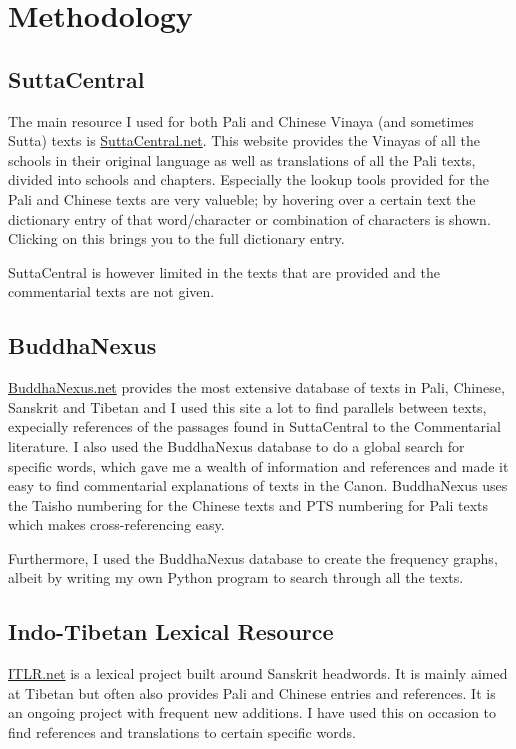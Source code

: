 \section{Methodology}

\subsection{SuttaCentral}
The main resource I used for both Pali and Chinese Vinaya (and sometimes Sutta) texts is \href{https://suttacentral.net/}{SuttaCentral.net}. This website provides the Vinayas of all the schools in their original language as well as translations of all the Pali texts, divided into schools and chapters. Especially the lookup tools provided for the Pali and Chinese texts are very valueble; by hovering over a certain text the dictionary entry of that word/character or combination of characters is shown. Clicking on this brings you to the full dictionary entry.

SuttaCentral is however limited in the texts that are provided and the commentarial texts are not given.

\subsection{BuddhaNexus}
\href{https://buddhanexus.net/}{BuddhaNexus.net} provides the most extensive database of texts in Pali, Chinese, Sanskrit and Tibetan and I used this site a lot to find parallels between texts, expecially references of the passages found in SuttaCentral to the Commentarial literature. I also used the BuddhaNexus database to do a global search for specific words, which gave me a wealth of information and references and made it easy to find commentarial explanations of texts in the Canon. BuddhaNexus uses the Taisho numbering for the Chinese texts and PTS numbering for Pali texts which makes cross-referencing easy.

Furthermore, I used the BuddhaNexus database to create the frequency graphs, albeit by writing my own Python program to search through all the texts.

\subsection{Indo-Tibetan Lexical Resource}
\href{https://www.itlr.net/}{ITLR.net} is a lexical project built around Sanskrit headwords. It is mainly aimed at Tibetan but often also provides Pali and Chinese entries and references. It is an ongoing project with frequent new additions. I have used this on occasion to find references and translations to certain specific words.